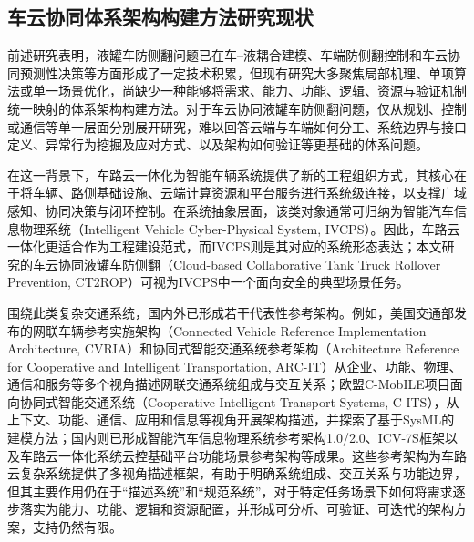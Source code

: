   \subsection{车云协同体系架构构建方法研究现状}

    前述研究表明，液罐车防侧翻问题已在车--液耦合建模、车端防侧翻控制和车云协同预测性决策等方面形成了一定技术积累，但现有研究大多聚焦局部机理、单项算法或单一场景优化，尚缺少一种能够将需求、能力、功能、逻辑、资源与验证机制统一映射的体系架构构建方法。对于车云协同液罐车防侧翻问题，仅从规划、控制或通信等单一层面分别展开研究，难以回答云端与车端如何分工、系统边界与接口定义、异常行为挖掘及应对方式、以及架构如何验证等更基础的体系问题。

    在这一背景下，车路云一体化为智能车辆系统提供了新的工程组织方式，其核心在于将车辆、路侧基础设施、云端计算资源和平台服务进行系统级连接，以支撑广域感知、协同决策与闭环控制\cite{likeqiang2020cloudcontrol,likeqiang2020principles,icv2023whiteroadcloud,ran2023vrc,guo2023greeniov}。在系统抽象层面，该类对象通常可归纳为智能汽车信息物理系统（Intelligent Vehicle Cyber-Physical System, IVCPS）。因此，车路云一体化更适合作为工程建设范式，而IVCPS则是其对应的系统形态表达；本文研究的车云协同液罐车防侧翻（Cloud-based Collaborative Tank Truck Rollover Prevention, CT2ROP）可视为IVCPS中一个面向安全的典型场景任务。

    围绕此类复杂交通系统，国内外已形成若干代表性参考架构。例如，美国交通部发布的网联车辆参考实施架构（Connected Vehicle Reference Implementation Architecture, CVRIA）和协同式智能交通系统参考架构（Architecture Reference for Cooperative and Intelligent Transportation, ARC-IT）从企业、功能、物理、通信和服务等多个视角描述网联交通系统组成与交互关系\cite{hejazi2022iottov2x,usdot2024arcit93}；欧盟C-MobILE项目面向协同式智能交通系统（Cooperative Intelligent Transport Systems, C-ITS），从上下文、功能、通信、应用和信息等视角开展架构描述，并探索了基于SysML的建模方法\cite{cmobile2024project,lu2018citsdeployment,ferrandez2018cmobilecase}；国内则已形成智能汽车信息物理系统参考架构1.0/2.0、ICV-7S框架以及车路云一体化系统云控基础平台功能场景参考架构等成果\cite{caicv2019cpsarch10,caicv2021cpsarch20,xu2023mbseivcps,sae2024cloudplatformarch10}。这些参考架构为车路云复杂系统提供了多视角描述框架，有助于明确系统组成、交互关系与功能边界，但其主要作用仍在于“描述系统”和“规范系统”，对于特定任务场景下如何将需求逐步落实为能力、功能、逻辑和资源配置，并形成可分析、可验证、可迭代的架构方案，支持仍然有限。

